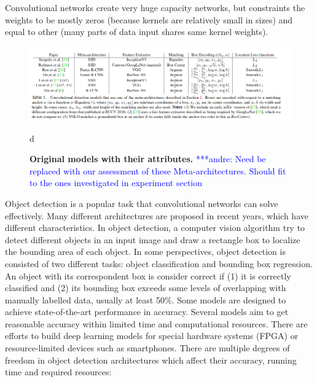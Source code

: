 \documentclass[conference]{IEEEtran}
\newcommand{\alnote}[1]{ {\textcolor{blue} { ***andre: #1 }}}
\newcommand{\alnote}[1]{}
\begin{document}
Convolutional networks create very huge capacity networks, but constraints the weights to be mostly zeros (because kernels are relatively small in sizes) and equal to other (many parts of data input shares same kernel weights).

\begin{figure}[htpb]
	  \centering
	  \includegraphics[width=\textwidth]{original_models}
	  \caption{\textbf{Original models with their attributes.}\alnote{Need be replaced with our assessment of these Meta-architectures. Should fit to the ones investigated in experiment section}}d
	  \label{fig:original_models}
\end{figure}

Object detection is a popular task that convolutional networks can solve effectively. Many different architectures are proposed in recent years, which have different characteristics. In object detection, a computer vision algorithm try to detect different objects in an input image and draw a rectangle box to localize the bounding area of each object. In some perspectives, object detection is consisted of two different tasks: object classification and bounding box regression. An object with its correspondent box is consider correct if (1) it is correctly classified and (2) its bounding box exceeds some levels of overlapping with manually labelled data, usually at least 50\%. Some models are designed to achieve state-of-the-art performance in accuracy. Several models aim to get reasonable accuracy within limited time and computational resources. There are efforts to build deep learning models for special hardware systems (FPGA) or resource-limited devices such as smartphones. There are multiple degrees of freedom in object detection architectures which affect their accuracy, running time and required resources:
\end{document}
